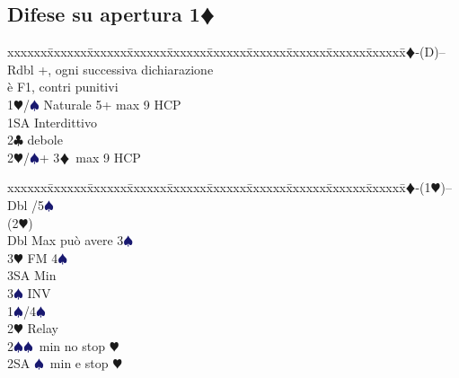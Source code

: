 \documentclass[a4paper,italian]{article}
\newcommand{\BC}{\textcolor{OliveGreen}{$\clubsuit$}}
\newcommand{\BD}{\textcolor{RedOrange}{$\vardiamondsuit$}}
\newcommand{\BH}{\textcolor{Red2}{$\varheartsuit${}}}
\newcommand{\BS}{\textcolor{MidnightBlue}{$\spadesuit${}}}
\newcommand{\pdfd}{\texorpdfstring{\BD{}}{D}}
\newenvironment{bidtable}
{\begin{tabbing}

    xxxxxx\=xxxxxx\=xxxxxx\=xxxxxx\=xxxxxx\=xxxxxx\=xxxxxx\=xxxxxx\=xxxxxx\=xxxxxx\=\kill}
{\end{tabbing} }%
\begin{document}
                                    \newpage
                                    \begin{multicols*}{2}

                                        \subsection{Difese su apertura 1\pdfd}

                                        \begin{bidtable}
                                            1\BD-(D)--\+\\
                                            Rdbl +, ogni successiva dichiarazione\+\\ è F1, contri punitivi\-\\
                                            1\BH/\BS \> Naturale 5+ max 9 HCP\\
                                            1SA \> Interdittivo\\
                                            2\BC \> debole\\
                                            2\BH/\BS {}+ 3\BD\ max 9 HCP\-
                                        \end{bidtable}
                                        \begin{bidtable}
                                            1\BD-(1\BH)--\+\\
                                            Dbl /5\BS \+\\
                                            (2\BH)\+\\
                                            Dbl \> Max può avere 3\BS \\
                                            3\BH \> FM 4\BS \+\\
                                            3SA \> Min\-\\
                                            3\BS \> INV\-\\
                                            1\BS {}/4\BS \+\\
                                            2\BH \> Relay\+\\
                                            2\BS {}\BS\ min no stop \BH \\
                                            2SA \BS\ min e stop \BH \\

\end{bidtable}
\end{multicols*}
\end{document}
